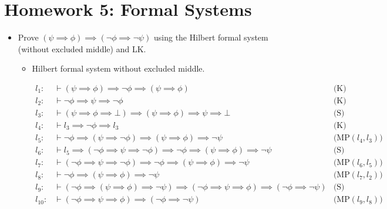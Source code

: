 \section{Homework 5: Formal Systems}

\begin{itemize}
    \item[Problem 1.] Prove $(\psi \implies \phi) \implies (\neg \phi \implies \neg \psi)$ using the Hilbert formal system (without excluded middle) and LK.

    \begin{itemize}
        \item[(a)] Hilbert formal system without excluded middle.
            
                \begin{align*}
                   l_1: &\vdash (\psi \implies \phi) \implies \neg \phi \implies (\psi \implies \phi) &\text{(K)} \\
                   l_2: &\vdash \neg \phi \implies \psi \implies \neg \phi &\text{(K)} \\
                   l_3: &\vdash (\psi \implies \phi \implies \bot) \implies (\psi \implies \phi) \implies \psi \implies \bot &\text{(S)} \\
                   l_4: &\vdash l_3 \implies \neg \phi \implies l_3 &\text{(K)} \\
                   l_5: &\vdash \neg \phi \implies (\psi \implies \neg \phi) \implies (\psi \implies \phi) \implies \neg \psi &\text{(MP$(l_4, l_3)$)} \\
                   l_6: &\vdash l_5 \implies (\neg \phi \implies \psi \implies \neg \phi) \implies \neg \phi \implies (\psi \implies \phi) \implies \neg \psi &\text{(S)} \\
                   l_7: &\vdash (\neg \phi \implies \psi \implies \neg \phi) \implies \neg \phi \implies (\psi \implies \phi) \implies \neg \psi &\text{(MP$(l_6, l_5)$)} \\
                   l_8: &\vdash \neg \phi \implies (\psi \implies \phi) \implies \neg \psi &\text{(MP$(l_7, l_2)$)} \\
                   l_{9}: &\vdash (\neg \phi \implies (\psi \implies \phi) \implies \neg \psi) \implies (\neg \phi \implies \psi \implies \phi) \implies (\neg \phi \implies \neg \psi) &\text{(S)} \\
                   l_{10}: &\vdash (\neg \phi \implies \psi \implies \phi) \implies (\neg \phi \implies \neg \psi) &\text{(MP$(l_{9}, l_8)$)} \\

\end{align*}
\end{itemize}
\end{itemize}
